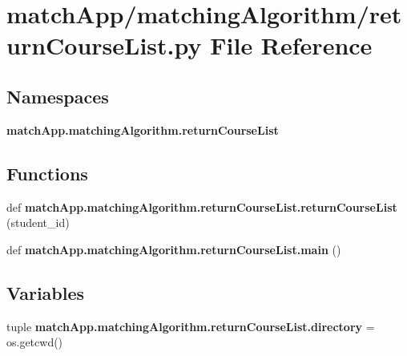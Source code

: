 \section{match\+App/matching\+Algorithm/return\+Course\+List.py File Reference}
\label{return_course_list_8py}
\subsection*{Namespaces}
\begin{DoxyCompactItemize}
\item 
 {\bf match\+App.\+matching\+Algorithm.\+return\+Course\+List}
\end{DoxyCompactItemize}
\subsection*{Functions}
\begin{DoxyCompactItemize}
\item 
def {\bf match\+App.\+matching\+Algorithm.\+return\+Course\+List.\+return\+Course\+List} (student\+\_\+id)
\item 
def {\bf match\+App.\+matching\+Algorithm.\+return\+Course\+List.\+main} ()
\end{DoxyCompactItemize}
\subsection*{Variables}
\begin{DoxyCompactItemize}
\item 
tuple {\bf match\+App.\+matching\+Algorithm.\+return\+Course\+List.\+directory} = os.\+getcwd()
\end{DoxyCompactItemize}
